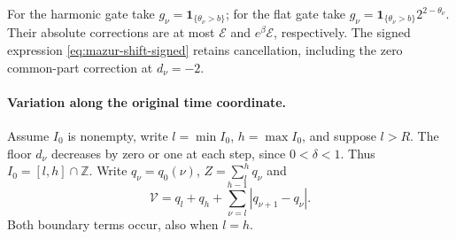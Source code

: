 \documentclass[11pt]{article}
\theoremstyle{remark}\newtheorem{remark}[proposition]{Remark}
\begin{document}
For the harmonic gate take $g_\nu=\mathbf1_{\{\theta_\nu>b\}}$;
for the flat gate take
$g_\nu=\mathbf1_{\{\theta_\nu>b\}}2^{2-\theta_\nu}$.
Their absolute corrections are at most $\mathcal E$ and
$e^\beta\mathcal E$, respectively. The signed expression
\eqref{eq:mazur-shift-signed} retains cancellation, including the
zero common-part correction at $d_\nu=-2$.

\paragraph{Variation along the original time coordinate.}
Assume $I_0$ is nonempty, write $l=\min I_0$, $h=\max I_0$,
and suppose $l>R$. The floor $d_\nu$ decreases by zero or one at
each step, since $0<\delta<1$. Thus $I_0=[l,h]\cap\mathbb Z$.
Write $q_\nu=q_0(\nu)$, $Z=\sum_{l}^{h}q_\nu$ and
\[
 \mathcal V=q_l+q_h+\sum_{\nu=l}^{h-1}|q_{\nu+1}-q_\nu|.
\]
Both boundary terms occur, also when $l=h$.
\end{document}
